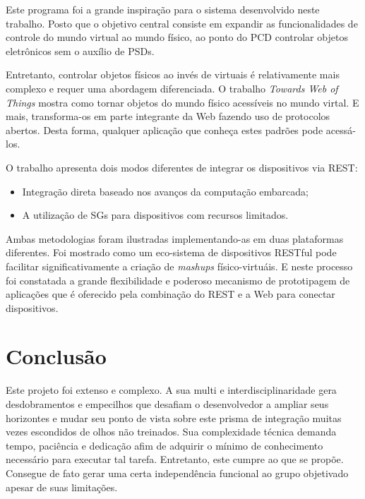 \documentclass[12pt,a4paper,oneside]{report}
\begin{document}
Este programa foi a grande inspiração para o sistema desenvolvido neste trabalho. Posto que o objetivo central consiste em expandir as funcionalidades de controle do mundo virtual ao mundo físico, ao ponto do PCD controlar objetos eletrônicos sem o auxílio de PSDs.

Entretanto, controlar objetos físicos ao invés de virtuais é relativamente mais complexo e requer uma abordagem diferenciada. O trabalho \emph{Towards Web of Things} \cite{wotdovad} mostra como tornar objetos do mundo físico acessíveis no mundo virtal. E mais, transforma-os em parte integrante da Web fazendo uso de protocolos abertos. Desta forma, qualquer aplicação que conheça estes padrões pode acessá-los.

O trabalho apresenta dois modos diferentes de integrar os dispositivos via REST:
\begin{itemize}
	\item Integração direta baseado nos avanços da computação embarcada;
	\item A utilização de SGs para dispositivos com recursos limitados.
\end{itemize}

Ambas metodologias foram ilustradas implementando-as em duas plataformas diferentes. Foi mostrado como um eco-sistema de dispositivos RESTful pode facilitar significativamente a criação de \emph{mashups} físico-virtuáis. E neste processo foi constatada a grande flexibilidade e poderoso mecanismo de prototipagem de aplicações que é oferecido pela combinação do REST e a Web para conectar dispositivos.


\chapter{Conclusão}
\label{chap:conclusao}

Este projeto foi extenso e complexo. A sua multi e interdisciplinaridade gera desdobramentos e empecilhos que desafiam o desenvolvedor a ampliar seus horizontes e mudar seu ponto de vista sobre este prisma de integração muitas vezes escondidos de olhos não treinados. Sua complexidade técnica demanda tempo, paciência e dedicação afim de adquirir o mínimo de conhecimento necessário para executar tal tarefa. Entretanto, este cumpre ao que se propõe. Consegue de fato gerar uma certa independência funcional ao grupo objetivado apesar de suas limitações.
\end{document}

